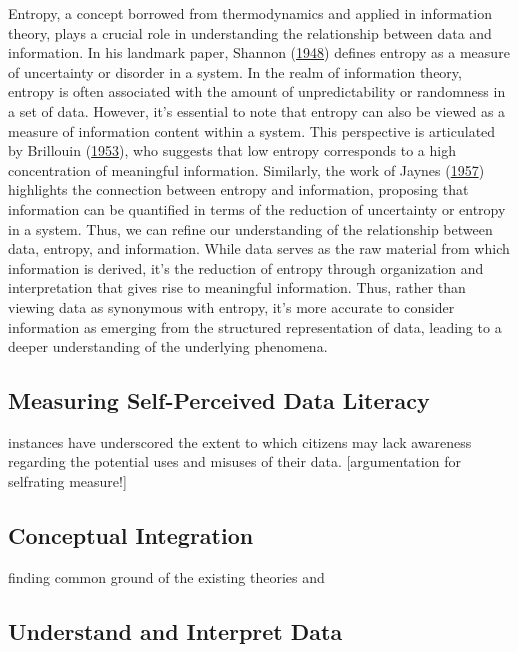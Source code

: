 \documentclass[
  12pt,
  a4paper,
  twoside]{article}
\begin{document}
Entropy, a concept borrowed from thermodynamics and applied in information theory, plays a crucial role in understanding the relationship between data and information. In his landmark paper, Shannon (\protect\hyperlink{ref-shannon1948}{1948}) defines entropy as a measure of uncertainty or disorder in a system. In the realm of information theory, entropy is often associated with the amount of unpredictability or randomness in a set of data.
However, it's essential to note that entropy can also be viewed as a measure of information content within a system. This perspective is articulated by Brillouin (\protect\hyperlink{ref-brillouin1953}{1953}), who suggests that low entropy corresponds to a high concentration of meaningful information. Similarly, the work of Jaynes (\protect\hyperlink{ref-jaynes1957}{1957}) highlights the connection between entropy and information, proposing that information can be quantified in terms of the reduction of uncertainty or entropy in a system.
Thus, we can refine our understanding of the relationship between data, entropy, and information. While data serves as the raw material from which information is derived, it's the reduction of entropy through organization and interpretation that gives rise to meaningful information. Thus, rather than viewing data as synonymous with entropy, it's more accurate to consider information as emerging from the structured representation of data, leading to a deeper understanding of the underlying phenomena.

\hypertarget{measuring-self-perceived-data-literacy}{%
\subsection{Measuring Self-Perceived Data Literacy}\label{measuring-self-perceived-data-literacy}}

instances have underscored the extent to which citizens may lack awareness regarding the potential uses and misuses of their data. {[}argumentation for selfrating measure!{]}

\hypertarget{conceptual-integration}{%
\subsection{Conceptual Integration}\label{conceptual-integration}}

finding common ground of the existing theories and

\hypertarget{understand-and-interpret-data}{%
\subsection{Understand and Interpret Data}\label{understand-and-interpret-data}}
\end{document}
